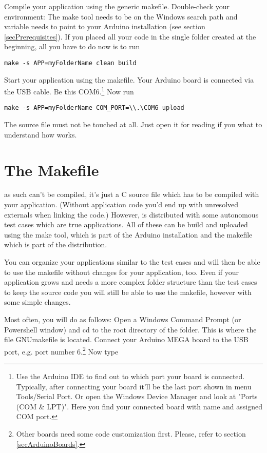 Compile your application using the generic makefile. Double-check your
environment: The make tool needs to be on the Windows search path and
variable  needs to point to your Arduino installation (see
section \ref{secPrerequisites}). If you placed all your code in the single
folder created at the beginning, all you have to do now is to run

\verb+make -s APP=myFolderName clean build+

Start your application using the makefile. Your Arduino board is connected
via the USB cable. Be this COM6.\footnote{Use the Arduino IDE to find out
to which port your board is connected. Typically, after connecting your board
it'll be the last port shown in menu Tools/Serial Port. Or open the
Windows Device Manager and look at "Ports (COM \& LPT)". Here you find your
connected board with name and assigned COM port.} Now run

\verb+make -s APP=myFolderName COM_PORT=\\.\COM6 upload+

The \rtos{} source file  must not be touched at all. Just open
it for reading if you what to understand how \rtos{} works.


\section{The Makefile}
\label{secMakefile}

\rtos{} as such can't be compiled, it's just a C source file which has to
be compiled with your application. (Without application code you'd end up
with unresolved externals when linking the code.) However, \rtos{} is
distributed with some autonomous test cases which are true \rtos{}
applications. All of these can be build and uploaded using the make tool,
which is part of the Arduino installation and the makefile which is part
of the \rtos{} distribution.

You can organize your applications similar to the test cases and will then
be able to use the makefile without changes for your application, too.
Even if your application grows and needs a more complex folder structure
than the test cases to keep the source code you will still be able to
use the makefile, however with some simple changes.

Most often, you will do as follows: Open a Windows Command Prompt (or
Powershell window) and cd to the root directory of the \rtos{} folder.
This is where the file GNUmakefile is located. Connect your Arduino MEGA
board to the USB port, e.g. port number 6.\footnote{Other boards need some
code customization first. Please, refer to section
\ref{secArduinoBoards}.} Now type

